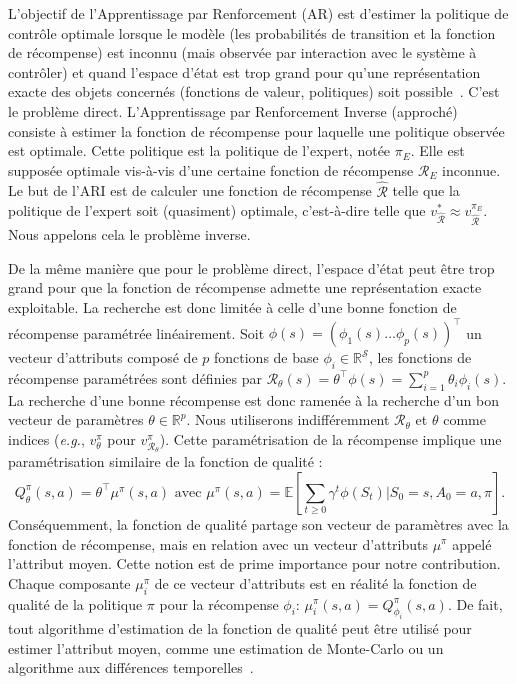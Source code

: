 \documentclass[french,utf8]{./hermes-journal}
\newcommand{\R}{\mathcal{R}}
\newcommand{\s}{\mathcal{S}}
\newcommand{\E}{\mathbb{E}}
\begin{document}
L'objectif de l'Apprentissage par Renforcement (AR) est d'estimer la politique de contrôle optimale lorsque le modèle (les probabilités de transition et la fonction de récompense) est inconnu (mais observée par interaction avec le système à contrôler) et quand l'espace d'état est trop grand pour qu'une représentation exacte des objets concernés (fonctions de valeur, politiques) soit possible~\cite{Bertseka996,Sutto998,szepesvari2010c}.
%
C'est le problème direct.
%
L'Apprentissage par Renforcement Inverse (approché)~\cite{N000} consiste à estimer la fonction de récompense pour laquelle une politique observée est optimale.
%
Cette politique est la politique de l'expert, notée $\pi_E$. Elle est supposée optimale vis-à-vis d'une certaine fonction de récompense $\mathcal{R}_E$ inconnue. Le but de l'ARI est de calculer une fonction de récompense $\hat{\R}$ telle que la politique de l'expert soit (quasiment) optimale, c'est-à-dire telle que $v^*_{\hat{\R}}
\approx v^{\pi_E}_{\hat{\R}}$.
%
Nous appelons cela le problème inverse.

De la même manière que pour le problème direct, l'espace d'état peut être trop grand pour que la fonction de récompense admette une représentation exacte exploitable. La recherche est donc limitée à celle d'une bonne fonction de récompense paramétrée linéairement. Soit $\phi(s) = (\phi_1(s)  \dots
\phi_p(s))^\top$
un vecteur d'attributs composé de $p$ fonctions de base $\phi_i\in\mathbb{R}^\s$, les fonctions de récompense paramétrées sont définies par $\R_\theta(s) = \theta^\top \phi(s) = \sum_{i=1}^p
\theta_i \phi_i(s)$.
La recherche d'une bonne récompense est donc ramenée à la recherche d'un bon vecteur de paramètres $\theta \in\mathbb{R}^p$. Nous utiliserons indifféremment $\R_\theta$ et $\theta$ comme indices (\textit{e.g.}, $v_\theta^\pi$ pour $v_{\R_\theta}^\pi$).
Cette paramétrisation de la récompense implique une paramétrisation similaire de la fonction de qualité :
\begin{equation}
  Q^\pi_\theta(s,a) = \theta^\top \mu^\pi(s,a) \text{ avec }
  \mu^\pi(s,a) = \E[\sum_{t\geq 0} \gamma^t
  \phi(S_t)|S_0=s,A_0=a,\pi].
  \label{eeu}
\end{equation}
Conséquemment, la fonction de qualité partage son vecteur de paramètres avec la fonction de récompense, mais en relation avec un vecteur d'attributs $\mu^\pi$ appelé l'attribut moyen. Cette notion est de prime importance pour notre contribution. Chaque composante $\mu_i^\pi$ de ce vecteur d'attributs est en réalité la fonction de qualité de la politique $\pi$ pour la récompense $\phi_i$: $\mu_i^\pi(s,a) = Q^\pi_{\phi_i}(s,a)$. De fait, tout algorithme d'estimation de la fonction de qualité peut être utilisé pour estimer l'attribut moyen, comme une estimation de Monte-Carlo ou un algorithme aux différences temporelles~\cite{Klei011}.
\end{document}
